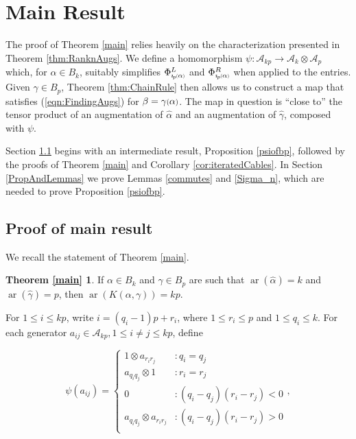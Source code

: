 \documentclass[11pt]{amsart}
\def\A{{\mathcal A}}
\def\cl{\mathcal}
\def\ar{\operatorname{ar}}
\newcommand*{\smallp}[1]{\scalebox{.75}{\ensuremath#1}}
\newcommand*{\subsmallp}[1]{\scalebox{.5}{\ensuremath#1}}
\newcommand{\subpp}[2][p]{\imath_{\hspace*{-1pt}#1}\hspace*{-.5pt}\subsmallp(#2\subsmallp)}
\theoremstyle{definition}
\begin{document}

\section{Main Result}
\label{SecMain}
The proof of Theorem \ref{main} relies heavily on the characterization presented in Theorem \ref{thm:RanknAugs}. We define a homomorphism $\psi:\cl A_{kp}\to\cl A_k\otimes\cl A_p$ which, for $\alpha\in B_k$, suitably simplifies $\Phi_{\subpp\alpha}^L$ and $\Phi_{\subpp\alpha}^R$ when applied to the entries. Given $\gamma\in B_p$, Theorem \ref{thm:ChainRule} then allows us to construct a map that satisfies (\ref{eqn:FindingAugs}) for $\beta=\gamma\smallp(\alpha\smallp)$. The map in question is ``close to'' the tensor product of an augmentation of $\hat\alpha$ and an augmentation of $\hat\gamma$, composed with $\psi$.

Section \ref{MainProof} begins with an intermediate result, Proposition \ref{psiofbp}, followed by the proofs of Theorem \ref{main} and Corollary \ref{cor:iteratedCables}.  In Section \ref{PropAndLemmas} we prove Lemmas \ref{commutes} and \ref{Sigma_n}, which are needed to prove Proposition \ref{psiofbp}.

\subsection{Proof of main result}
\label{MainProof}
We recall the statement of Theorem \ref{main}.

\newtheorem*{main}{Theorem \ref{main}}
\begin{main}
If $\alpha\in B_k$ and $\gamma\in B_p$ are such that $\ar(\hat{\alpha})=k$ and $\ar(\hat{\gamma})=p$, then $\ar(K(\alpha,\gamma))=kp$.
\end{main}

For $1\le i\le kp$, write $i = (q_i-1)p + r_i$, where $1\le r_i \le p$ and $1\le q_i\le k$.  For each generator $a_{ij}\in\A_{kp}, 1\le i\ne j\le kp$, define

\begin{equation}
\psi(a_{ij}) =
  \begin{cases}
         1\otimes a_{r_ir_j} & \colon q_i = q_j\\
         a_{q_iq_j}\otimes 1 & \colon r_i = r_j\\
         0 & \colon (q_i-q_j)(r_i-r_j)<0\\
         a_{q_iq_j}\otimes a_{r_ir_j} & \colon (q_i-q_j)(r_i-r_j)>0\\
  \end{cases},
  \label{defn:psi}
\end{equation}
\end{document}
